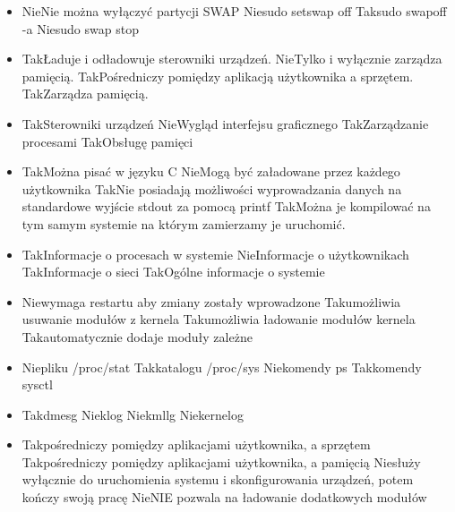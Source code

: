 \begin{itemize}
	\item {}
	{Nie}{Nie można wyłączyć partycji SWAP}
	{Nie}{sudo setswap off}
	{Tak}{sudo swapoff -a}
	{Nie}{sudo swap stop}
	
	\item {}
	{Tak}{Ładuje i odładowuje sterowniki urządzeń.}
	{Nie}{Tylko i wyłącznie zarządza pamięcią.}
	{Tak}{Pośredniczy pomiędzy aplikacją użytkownika a sprzętem.}
	{Tak}{Zarządza pamięcią.}
	
	\item {}
	{Tak}{Sterowniki urządzeń}
	{Nie}{Wygląd interfejsu graficznego}
	{Tak}{Zarządzanie procesami}
	{Tak}{Obsługę pamięci}
	
	\item {}
	{Tak}{Można pisać w języku C}
	{Nie}{Mogą być załadowane przez każdego użytkownika}
	{Tak}{Nie posiadają możliwości wyprowadzania danych na standardowe wyjście stdout za pomocą printf}
	{Tak}{Można je kompilować na tym samym systemie na którym zamierzamy je uruchomić.}
	
	\item {}
	{Tak}{Informacje o procesach w systemie}
	{Nie}{Informacje o użytkownikach}
	{Tak}{Informacje o sieci}
	{Tak}{Ogólne informacje o systemie}
	
	\item {}
	{Nie}{wymaga restartu aby zmiany zostały wprowadzone}
	{Tak}{umożliwia usuwanie modułów z kernela}
	{Tak}{umożliwia ładowanie modułów kernela}
	{Tak}{automatycznie dodaje moduły zależne}
	
	\item {}
	{Nie}{pliku /proc/stat}
	{Tak}{katalogu /proc/sys}
	{Nie}{komendy ps}
	{Tak}{komendy sysctl}
	
	\item {}
	{Tak}{dmesg}
	{Nie}{klog}
	{Nie}{kmllg}
	{Nie}{kernelog}
	
	\item {}%
	{Tak}{pośredniczy pomiędzy aplikacjami użytkownika, a sprzętem}%
	{Tak}{pośredniczy pomiędzy aplikacjami użytkownika, a pamięcią}%
	{Nie}{służy wyłącznie do uruchomienia systemu i skonfigurowania urządzeń, potem kończy swoją pracę}%
	{Nie}{NIE pozwala na ładowanie dodatkowych modułów}
	

\end{itemize}
